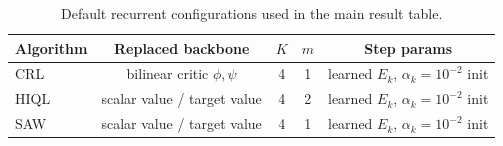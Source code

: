 \documentclass{article}
\begin{document}
\begin{table}[h]
\centering
\small
\setlength{\tabcolsep}{5pt}
\caption{Default recurrent configurations used in the main result table.}
\label{tab:recurrent_config_app}
\begin{tabular}{lcccc}
\toprule
Algorithm & Replaced backbone & $K$ & $m$ & Step params \\
\midrule
CRL & bilinear critic $\phi,\psi$ & 4 & 1 & learned $E_k$, $\alpha_k{=}10^{-2}$ init \\
HIQL & scalar value / target value & 4 & 2 & learned $E_k$, $\alpha_k{=}10^{-2}$ init \\
SAW & scalar value / target value & 4 & 1 & learned $E_k$, $\alpha_k{=}10^{-2}$ init \\
\bottomrule
\end{tabular}
\end{table}
\FloatBarrier
\end{document}
